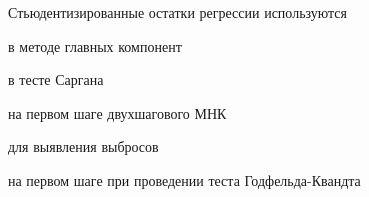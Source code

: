 
\begin{question}
Стьюдентизированные остатки регрессии используются
\begin{answerlist}
  \item в методе главных компонент
  \item в тесте Саргана
  \item на первом шаге двухшагового МНК
  \item для выявления выбросов
  \item на первом шаге при проведении теста Годфельда-Квандта
\end{answerlist}
\end{question}


